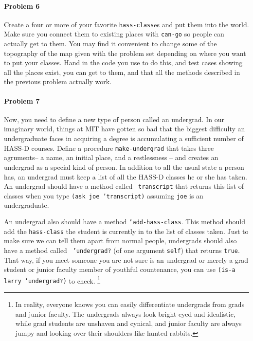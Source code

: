 \paragraph{Problem 6}

Create a four or more of your favorite {\tt hass-class}es and put them
into the world. Make sure you connect them to existing places with
{\tt can-go} so people can actually get to them.  You may find it
convenient to change some of the topography of the map given with the
problem set depending on where you want to put your classes.   Hand
in the code you use to do this, and test cases showing all the places
exist, you can get to them, and that all the methods described in the
previous problem actually work.

\paragraph{Problem 7}

Now, you need to define a new type of person called an undergrad.  In
our imaginary world, things at MIT have gotten so bad that the
biggest difficulty an undergraduate faces in acquiring a degree is 
accumulating a sufficient number of HASS-D courses.  Define a
procedure {\tt make-undergrad} that takes three agruments-- a name, an
initial place, and a restlessness -- and creates an undergrad as a
special kind of person.  In addition to all the usual state a person
has, an undergrad must keep a list of all the  HASS-D classes he or
she has taken.  An undergrad should have a method called {\tt
transcript} that returns this list of classes when you type \linebreak
{\tt (ask joe 'transcript)} assuming {\tt joe} is an undergraduate.  

An undergrad also should have a method {\tt 'add-hass-class}.  This
method should add the {\tt hass-class} the student is currently in to
the list of classes taken. Just to make sure we can tell them apart
from normal people, undergrads should also have a method called {\tt
'undergrad?} (of one argument {\tt self}) that returns {\tt true}.
That way, if you meet someone you are not sure is an
undergrad or merely a grad student or junior faculty member of
youthful countenance, you can use {\tt (is-a larry 'undergrad?)} to check. 
\footnote{In reality, everyone knows you can easily differentiate
undergrads from grads and junior faculty.  The undergrads always look
bright-eyed and idealistic, while grad students are unshaven and
cynical, and junior faculty are always jumpy and looking over their
shoulders like hunted rabbits.}

